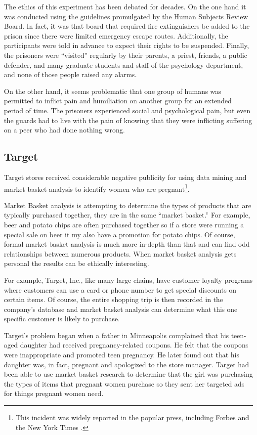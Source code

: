The ethics of this experiment has been debated for decades. On the one hand it was conducted using the guidelines promulgated by the Human Subjects Review Board. In fact, it was that board that required fire extinguishers be added to the prison since there were limited emergency escape routes. Additionally, the participants were told in advance to expect their rights to be suspended. Finally, the prisoners were ``visited'' regularly by their parents, a priest, friends, a public defender, and many graduate students and staff of the psychology department, and none of those people raised any alarms.

On the other hand, it seems problematic that one group of humans was permitted to inflict pain and humiliation on another group for an extended period of time. The prisoners experienced social and psychological pain, but even the guards had to live with the pain of knowing that they were inflicting suffering on a peer who had done nothing wrong.

\subsection{Target}

Target stores received considerable negative publicity for using data mining and market basket analysis to identify women who are pregnant\footnote{This incident was widely reported in the popular press, including Forbes \cite{hill2012target} and the New York Times \cite{duhigg2012companies}.}. 

Market Basket analysis is attempting to determine the types of products that are typically purchased together, they are in the same ``market basket.'' For example, beer and potato chips are often purchased together so if a store were running a special sale on beer it my also have a promotion for potato chips. Of course, formal market basket analysis is much more in-depth than that and can find odd relationships between numerous products. When market basket analysis gets personal the results can be ethically interesting.

For example, Target, Inc., like many large chains, have customer loyalty programs where customers can use a card or phone number to get special discounts on certain items. Of course, the entire shopping trip is then recorded in the company's database and market basket analysis can determine what this one specific customer is likely to purchase.

Target's problem began when a father in Minneapolis complained that his teen-aged daughter had received pregnancy-related coupons. He felt that the coupons were inappropriate and promoted teen pregnancy. He later found out that his daughter was, in fact, pregnant and apologized to the store manager. Target had been able to use market basket research to determine that the girl was purchasing the types of items that pregnant women purchase so they sent her targeted ads for things pregnant women need.

